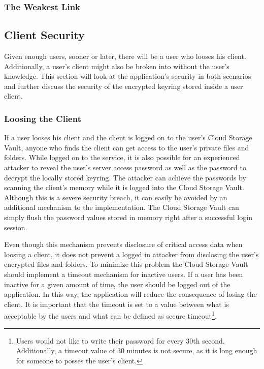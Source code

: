 \documentclass[pdftex,english,10pt,b5paper,twoside]{book}
\begin{document}
\subsubsection{The Weakest Link}


\subsection{Client Security}
Given enough users, sooner or later, there will be a user who looses his client.
Additionally, a user's client might also be broken into without the user's
knowledge. This section will look at the application's security in both
scenarios and further discuss the security of the encrypted keyring stored
inside a user client.

\subsubsection{Loosing the Client}
If a user looses his client and the client is logged on to the user's Cloud
Storage Vault, anyone who finds the client can get access to the user's private
files and folders. While logged on to the service, it is also possible for an
experienced attacker to reveal the user's server access password as well as the
password to decrypt the locally stored keyring. The attacker can achieve the passwords by
scanning the client's memory while it is logged into the Cloud Storage Vault.
Although this is a severe security breach, it can easily be avoided by an
additional mechanism to the implementation. The Cloud Storage Vault can simply
flush the password values stored in memory right after a successful login session.

Even though this mechanism prevents disclosure of critical access data when
loosing a client, it does not prevent a logged in attacker from disclosing the user's encrypted files and folders.
To minimize this problem the Cloud Storage Vault should implement a
timeout mechanism for inactive users. If a user has been inactive for a given
amount of time, the user should be logged out of the application. In this way,
the application will reduce the consequence of losing the client. It is
important that the timeout is set to a value between what is acceptable by the users
and what can be defined as secure timeout\footnote{Users would not like to write
their password for every 30th second. Additionally, a timeout value of 30 minutes is
not secure, as it is long enough for someone to posses the user's client.}.
\end{document}
